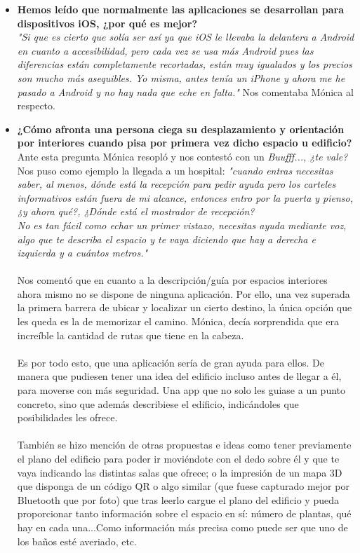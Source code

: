 \documentclass{article}
\begin{document}
\begin{itemize}
		\item \textbf{Hemos leído que normalmente las aplicaciones se desarrollan para dispositivos iOS, ¿por qué es mejor?} 
		\\
		\textit{"Si que es cierto que solía ser así ya que iOS le llevaba la delantera a Android en cuanto a accesibilidad, pero cada vez se usa más Android pues las diferencias están completamente recortadas, están muy igualados y los precios son mucho más asequibles. Yo misma, antes tenía un iPhone y ahora me he pasado a Android y no hay nada que eche en falta."} Nos comentaba Mónica al respecto.
		
		\item \textbf{¿Cómo afronta una persona ciega su desplazamiento y orientación por interiores cuando pisa por primera vez dicho espacio u edificio?}
		\\
		Ante esta pregunta Mónica resopló y nos contestó con un \textit{Buufff..., ¿te vale?}
		\\
		Nos puso como ejemplo la llegada a un hospital: \textit{"cuando entras necesitas saber, al menos, dónde está la recepción para pedir ayuda pero los carteles informativos están fuera de mi alcance, entonces entro por la puerta y pienso, ¿y ahora qué?, ¿Dónde está el mostrador de recepción? 
		\\
		No es tan fácil como echar un primer vistazo, necesitas ayuda mediante voz, algo que te describa el espacio y te vaya diciendo que hay a derecha e izquierda y a cuántos metros."}
		\\
		\\
		Nos comentó que en cuanto a la descripción/guía por espacios interiores ahora mismo no se dispone de ninguna aplicación. Por ello, una vez superada la primera barrera de ubicar y localizar un cierto destino, la única opción que les queda es la de memorizar el camino. Mónica, decía sorprendida que era increíble la cantidad de rutas que tiene en la cabeza.
		\\
		\\
		Es por todo esto, que una aplicación sería de gran ayuda para ellos. De manera que pudiesen tener una idea del edificio incluso antes de llegar a él, para moverse con más seguridad. Una app que no solo les guiase a un punto concreto, sino que además describiese el edificio, indicándoles que posibilidades les ofrece.
		\\
		\\
		También se hizo mención de otras propuestas e ideas como tener previamente el plano del edificio para poder ir moviéndote con el dedo sobre él y que te vaya indicando las distintas salas que ofrece; o la impresión de un mapa 3D que disponga de un código QR o algo similar (que fuese capturado mejor por Bluetooth que por foto) que tras leerlo cargue el plano del edificio y pueda proporcionar tanto información sobre el espacio en sí: número de plantas, qué hay en cada una...Como información más precisa como puede ser que uno de los baños esté averiado, etc.

\end{itemize}
\end{document}

